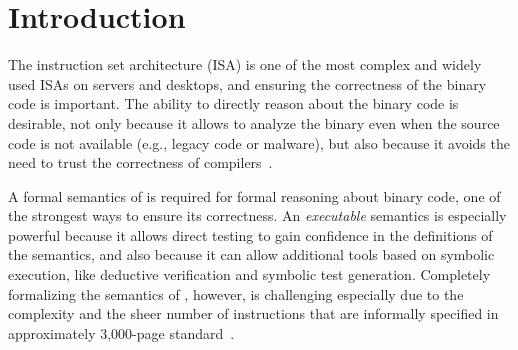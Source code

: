     \section{Introduction}
\label{sec:Intro}


The \ISA instruction set architecture (ISA) is one of the most complex and widely used ISAs on servers and desktops, 
and ensuring the correctness of the \ISA binary code is important.
%
The ability to directly reason about the binary code is desirable, not only because it allows to analyze the binary even when the source code is not available (e.g., legacy code or malware), but also because it avoids the need to trust the correctness of compilers~\cite{Thompson,WYSINWYE}.



A formal semantics of \ISA is required for formal reasoning about binary code, one of the strongest ways to ensure its correctness.
%
An \emph{executable} semantics is especially powerful because it allows direct testing to gain confidence in the definitions of the semantics, and also because it can allow additional tools based on symbolic execution, like deductive verification and symbolic test generation.
%
Completely formalizing the semantics of \ISA, however, is challenging especially due to the complexity and the sheer number of instructions that are informally specified in approximately 3,000-page standard~\cite{IntelManual}.
%

